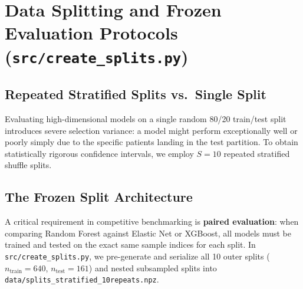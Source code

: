 \documentclass[10pt,a4paper]{article}
\begin{document}
\section{Data Splitting and Frozen Evaluation Protocols (\texttt{src/create\_splits.py})}

\subsection{Repeated Stratified Splits vs.\ Single Split}
Evaluating high-dimensional models on a single random 80/20 train/test split introduces severe selection variance: a model might perform exceptionally well or poorly simply due to the specific patients landing in the test partition. To obtain statistically rigorous confidence intervals, we employ $S = 10$ repeated stratified shuffle splits.

\subsection{The Frozen Split Architecture}
A critical requirement in competitive benchmarking is \textbf{paired evaluation}: when comparing Random Forest against Elastic Net or XGBoost, all models must be trained and tested on the exact same sample indices for each split. In \texttt{src/create\_splits.py}, we pre-generate and serialize all 10 outer splits ($n_{\text{train}} = 640$, $n_{\text{test}} = 161$) and nested subsampled splits into \texttt{data/splits\_stratified\_10repeats.npz}.
\end{document}
